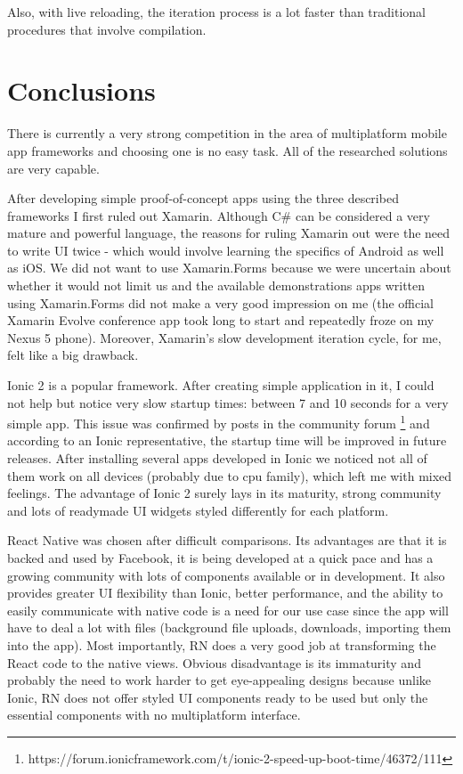 Also, with live reloading, the iteration process is a lot faster than traditional procedures that involve compilation.


\section{Conclusions}

There is currently a very strong competition in the area of multiplatform mobile app frameworks and choosing one is no easy task. All of the researched solutions are very capable. 

After developing simple proof-of-concept apps using the three described frameworks I first ruled out Xamarin. Although C\# can be considered a very mature and powerful language, the reasons for ruling Xamarin out were the need to write UI twice - which would involve learning the specifics of Android as well as iOS. We did not want to use Xamarin.Forms because we were uncertain about whether it would not limit us and the available demonstrations apps written using Xamarin.Forms did not make a very good impression on me (the official Xamarin Evolve conference app took long to start and repeatedly froze on my Nexus 5 phone). Moreover, Xamarin's slow development iteration cycle, for me, felt like a big drawback.

Ionic 2 is a popular framework. After creating simple application in it, I could not help but notice very slow startup times: between 7 and 10 seconds for a very simple app. This issue was confirmed by posts in the community forum \footnote{https://forum.ionicframework.com/t/ionic-2-speed-up-boot-time/46372/111} and according to an Ionic representative, the startup time will be improved in future releases. After installing several apps developed in Ionic we noticed not all of them work on all devices (probably due to cpu family), which left me with mixed feelings. The advantage of Ionic 2 surely lays in its maturity, strong community and lots of readymade UI widgets styled differently for each platform.


React Native was chosen after difficult comparisons. Its advantages are that it is backed and used by Facebook, it is being developed at a quick pace and has a growing community with lots of components available or in development. It also provides greater UI flexibility than Ionic, better performance, and the ability to easily communicate with native code is a need for our use case since the app will have to deal a lot with files (background file uploads, downloads, importing them into the app). Most importantly, RN does a very good job at transforming the React code to the native views. Obvious disadvantage is its immaturity and probably the need to work harder to get eye-appealing designs because unlike Ionic, RN does not offer styled UI components ready to be used but only the essential components with no multiplatform interface. 

